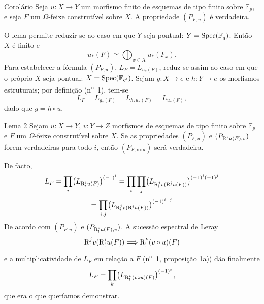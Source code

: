\begin{statement}{Corolário}
Seja $u:X\to Y$ um morfismo finito de esquemas de tipo finito sobre $\mathbb F_p$, e seja $F$ um $\Omega$-feixe construtível sobre $X$. A propriedade $(P_{F,u})$ é verdadeira.
\end{statement}

O lema permite reduzir-se ao caso em que $Y$ seja pontual: $Y=\operatorname{Spec}(\mathbb F_q)$. Então $X$ é finito e
\[
u_*(F)\simeq \bigoplus_{x\in X}u_*(F_x).
\]
Para estabelecer a fórmula $(P_{F,u})$, $L_F=L_{u_*(F)}$, reduz-se assim ao caso em que o próprio $X$ seja pontual: $X=\operatorname{Spec}(\mathbb F_{q'})$. Sejam $g:X\to e$ e $h:Y\to e$ os morfismos estruturais; por definição (n\textsuperscript{o}~1), tem-se
\[
L_F=L_{g_*(F)}=L_{h_*u_*(F)}=L_{u_*(F)},
\]
dado que $g=h\circ u$.

\begin{statement}{Lema 2}
Sejam $u:X\to Y$, $v:Y\to Z$ morfismos de esquemas de tipo finito sobre $\mathbb F_p$ e $F$ um $\Omega$-feixe construtível sobre $X$. Se as propriedades $(P_{F,u})$ e $(P_{\mathrm{R}^i_!u(F),v})$ forem verdadeiras para todo $i$, então $(P_{F,v\circ u})$ será verdadeira.
\end{statement}

De facto,
\[
L_F=\prod_i\bigl(L_{\mathrm{R}^i_!u(F)}\bigr)^{(-1)^i}
 =\prod_i\prod_j\bigl(L_{\mathrm{R}^j_!v(\mathrm{R}^i_!u(F))}\bigr)^{(-1)^i(-1)^j}
\]
\[
=\prod_{i,j}\bigl(L_{\mathrm{R}^j_!v(\mathrm{R}^i_!u(F))}\bigr)^{(-1)^{i+j}}
\]
De acordo com $(P_{F,u})$ e $(P_{\mathrm{R}^i_!u(F),v})$. A sucessão espectral de Leray
\[
\mathrm{R}^j_!v(\mathrm{R}^i_!u(F))\Longrightarrow \mathrm{R}^k_!(v\circ u)(F)
\]
e a multiplicatividade de $L_F$ em relação a $F$ (n\textsuperscript{o}~1, proposição 1a)) dão finalmente
\[
L_F=\prod_k\bigl(L_{\mathrm{R}^k_!(v\circ u)(F)}\bigr)^{(-1)^k},
\]
que era o que queríamos demonstrar.
